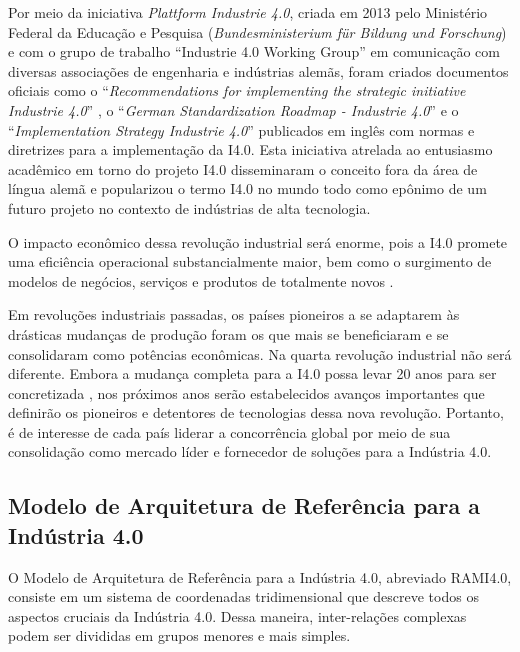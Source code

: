 	Por meio da iniciativa \textit{Plattform Industrie 4.0}, criada em 2013 pelo Ministério Federal da Educação e Pesquisa (\textit{Bundesministerium für Bildung und Forschung}) \cite{germany2019plattform} e com o grupo de trabalho ``Industrie 4.0 Working Group'' em comunicação com diversas associações de engenharia e indústrias alemãs, foram criados documentos oficiais como o ``\textit{Recommendations for implementing the strategic initiative Industrie 4.0}'' \cite{kagermann2013recommendations}, o ``\textit{German Standardization Roadmap - Industrie 4.0}'' \cite{adolph2018roadmap} e o ``\textit{Implementation Strategy Industrie 4.0}'' \cite{bitkom2016implementation} publicados em inglês com normas e diretrizes para a implementação da I4.0. Esta iniciativa atrelada ao entusiasmo acadêmico em torno do projeto I4.0 disseminaram o conceito fora da área de língua alemã e popularizou o termo I4.0 no mundo todo como epônimo de um futuro projeto no contexto de indústrias de alta tecnologia.

	O impacto econômico dessa revolução industrial será enorme, pois a I4.0 promete uma eficiência operacional substancialmente maior, bem como o surgimento de modelos de negócios, serviços e produtos de totalmente novos \cite{hermann2016design}.
	
	Em revoluções industriais passadas, os países pioneiros a se adaptarem às drásticas mudanças de produção foram os que mais se beneficiaram e se consolidaram como potências econômicas. Na quarta revolução industrial não será diferente. Embora a mudança completa para a I4.0 possa levar 20 anos para ser concretizada \cite{russmann2015industryfour}, nos próximos anos serão estabelecidos avanços importantes que definirão os pioneiros e detentores de tecnologias dessa nova revolução. Portanto, é de interesse de cada país liderar a concorrência global por meio de sua consolidação como mercado líder e fornecedor de soluções para a Indústria 4.0.

	\subsection{Modelo de Arquitetura de Referência para a Indústria 4.0}
	
	O Modelo de Arquitetura de Referência para a Indústria 4.0, abreviado RAMI4.0, consiste em um sistema de coordenadas tridimensional que descreve todos os aspectos cruciais da Indústria 4.0. Dessa maneira, inter-relações complexas podem ser divididas em grupos menores e mais simples.
	
